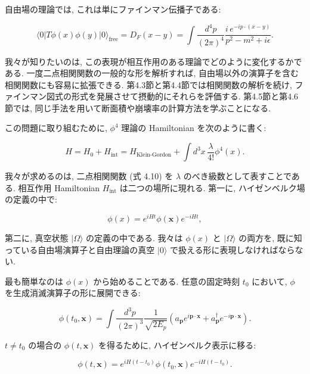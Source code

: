 \documentclass[a4paper,12pt]{article}
\begin{document}
自由場の理論では, これは単にファインマン伝播子である:

\begin{equation*}
\langle 0 | T \phi(x)\phi(y) | 0 \rangle_{\text{free}}
= D_F(x-y) = \int \frac{d^4p}{(2\pi)^4} \frac{i \, e^{-ip\cdot (x-y)}}{p^2 - m^2 + i\epsilon} .
\end{equation*}

我々が知りたいのは, この表現が相互作用のある理論でどのように変化するかである. 
一度二点相関関数の一般的な形を解析すれば, 自由場以外の演算子を含む相関関数にも容易に拡張できる. 
第4.3節と第4.4節では相関関数の解析を続け, ファインマン図式の形式を発展させて摂動的にそれらを評価する. 
第4.5節と第4.6節では, 同じ手法を用いて断面積や崩壊率の計算方法を学ぶことになる.

この問題に取り組むために, $\phi^4$ 理論の Hamiltonian を次のように書く:

\begin{equation*}
H = H_0 + H_{\text{int}}
= H_{\text{Klein-Gordon}} + \int d^3x \, \frac{\lambda}{4!}\phi^4(x).
\end{equation*}

我々が求めるのは, 二点相関関数 (式 4.10) を $\lambda$ のべき級数として表すことである. 
相互作用 Hamiltonian $H_{\text{int}}$ は二つの場所に現れる. 
第一に, ハイゼンベルク場の定義の中で:

\begin{equation*}
\phi(x) = e^{iHt}\phi(\mathbf{x})e^{-iHt},
\end{equation*}

第二に, 真空状態 $\lvert \Omega \rangle$ の定義の中である. 
我々は $\phi(x)$ と $\lvert \Omega \rangle$ の両方を, 既に知っている自由場演算子と自由理論の真空 $\lvert 0 \rangle$ で扱える形に表現しなければならない.

最も簡単なのは $\phi(x)$ から始めることである. 
任意の固定時刻 $t_0$ において, $\phi$ を生成消滅演算子の形に展開できる:

\begin{equation*}
\phi(t_0, \mathbf{x}) = \int \frac{d^3p}{(2\pi)^3} \frac{1}{\sqrt{2E_p}} 
\left( a_{\mathbf{p}} e^{i\mathbf{p}\cdot \mathbf{x}} + a^\dagger_{\mathbf{p}} e^{-i\mathbf{p}\cdot \mathbf{x}} \right).
\end{equation*}

$t \neq t_0$ の場合の $\phi(t,\mathbf{x})$ を得るために, ハイゼンベルク表示に移る:

\begin{equation*}
\phi(t,\mathbf{x}) = e^{iH(t-t_0)} \phi(t_0,\mathbf{x}) e^{-iH(t-t_0)} .
\end{equation*}
\end{document}
